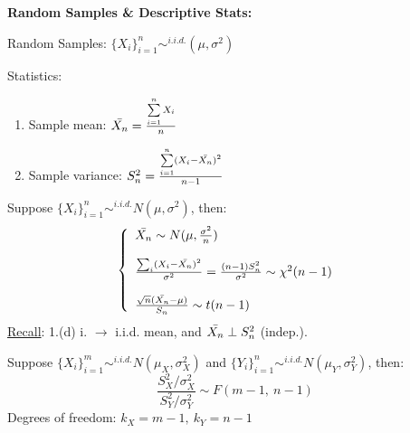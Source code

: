 \documentclass[a4paper,12pt]{article} %
\begin{document}
\begin{enumerate}
\item {{\bf Random Samples \& Descriptive Stats:}
\begin{enumerate}
    \item {Random Samples: $\{X_i\}_{i=1}^n \sim^{i.i.d.}(\mu, \sigma^2)$
    }
    \item {Statistics:
    \begin{enumerate}
        \item {Sample mean: $\Bar{X_n}=\frac{\sum\limits_{i=1}^nX_i}{n}$
        }
        \item {Sample variance: $S_n^2=\frac{\sum\limits_{i=1}^n(X_i-\Bar{X_n})^2}{n-1}$
        }
    \end{enumerate}
         \item {Suppose $\{X_i\}_{i=1}^n \sim^{i.i.d.}N(\mu, \sigma^2)$, then: 
        \begin{equation}
        \left \{
        \begin{array}{lr} 
        \Bar{X_n} \sim N(\mu,\frac{\sigma^2}{n}) & \\\\ \frac{\sum_i(X_i-\Bar{X_n})^2}{\sigma^2}=\frac{(n-1)S_n^2}{\sigma^2} \sim \chi^2(n-1) & \\\\ \frac{\sqrt{n}(\Bar{X_n}-\mu)}{S_n} \sim t(n-1) & 
        \end{array}\right.
        \end{equation}
        \underline{Recall}: 1.(d) i. $\rightarrow$ i.i.d. mean, and $\Bar{X_n} \perp S_n^2$} (indep.). 
        \item {Suppose $\{X_i\}_{i=1}^m \sim^{i.i.d.}N(\mu_X, \sigma_X^2)$ and $\{Y_i\}_{i=1}^n \sim^{i.i.d.}N(\mu_Y, \sigma_Y^2)$, then:
        $$ \frac{S_X^2/\sigma_X^2}{S_Y^2/\sigma_Y^2} \sim F(m-1,\ n-1) $$ Degrees of freedom: $k_X=m-1,\ k_Y=n-1$}\\
    }
\end{enumerate}
}


\end{enumerate}
\end{document}

